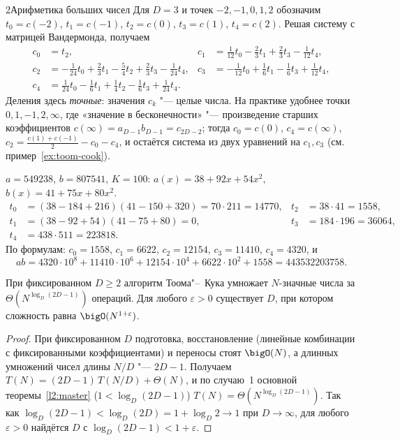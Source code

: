 \begin{lecture}{2}{Арифметика больших чисел}
Для $D = 3$ и точек $-2, -1, 0, 1, 2$ обозначим $t_0 = c(-2)$, $t_1 = c(-1)$, $t_2 = c(0)$,
$t_3 = c(1)$, $t_4 = c(2)$. Решая систему с матрицей Вандермонда, получаем
\[
\begin{aligned}
  c_0 &= t_2, &
  c_1 &= \tfrac{1}{12}t_0 - \tfrac23 t_1 + \tfrac23 t_3 - \tfrac1{12} t_4,\\
  c_2 &= -\tfrac1{24} t_0 + \tfrac23 t_1 - \tfrac54 t_2 + \tfrac23 t_3 - \tfrac1{24} t_4, &
  c_3 &= -\tfrac1{12} t_0 + \tfrac16 t_1 - \tfrac16 t_3 + \tfrac1{12} t_4,\\
  c_4 &= \tfrac1{24} t_0 - \tfrac16 t_1 + \tfrac14 t_2 - \tfrac16 t_3 + \tfrac1{24} t_4.
\end{aligned}
\]
Деления здесь \emph{точные}: значения $c_k$ "--- целые числа. На практике удобнее точки
$0, 1, -1, 2, \infty$, где «значение в бесконечности» "--- произведение старших коэффициентов
$c(\infty) = a_{D-1} b_{D-1} = c_{2D-2}$; тогда $c_0 = c(0)$, $c_4 = c(\infty)$,
$c_2 = \frac{c(1) + c(-1)}{2} - c_0 - c_4$, и остаётся система из двух уравнений на $c_1, c_3$
(см. пример~\ref{ex:toom-cook}).

\begin{example}
$a = 549238$, $b = 807541$, $K = 100$: $a(x) = 38 + 92x + 54x^2$, $b(x) = 41 + 75x + 80x^2$.
\[
\begin{aligned}
  t_0 &= (38 - 184 + 216)(41 - 150 + 320) = 70 \cdot 211 = 14770, &
  t_2 &= 38 \cdot 41 = 1558,\\
  t_1 &= (38 - 92 + 54)(41 - 75 + 80) = 0, & t_3 &= 184 \cdot 196 = 36064,\\
  t_4 &= 438 \cdot 511 = 223818.
\end{aligned}
\]
По формулам: $c_0 = 1558$, $c_1 = 6622$, $c_2 = 12154$, $c_3 = 11410$, $c_4 = 4320$, и
\[
  ab = 4320 \cdot 10^8 + 11410 \cdot 10^6 + 12154 \cdot 10^4 + 6622 \cdot 10^2 + 1558
     = 443532203758.
\]
\end{example}


\begin{theorem}\label{l2:toom}
При фиксированном $D \ge 2$ алгоритм Тоома"--~Кука умножает $N$-значные числа за
$\Theta(N^{\log_D (2D - 1)})$ операций. Для любого $\varepsilon > 0$ существует $D$, при котором
сложность равна $\bigO(N^{1 + \varepsilon})$.
\end{theorem}

\begin{proof}
При фиксированном $D$ подготовка, восстановление (линейные комбинации с фиксированными
коэффициентами) и переносы стоят $\bigO(N)$, а длинных умножений чисел длины $N/D$ "---
$2D - 1$. Получаем $T(N) = (2D - 1)\,T(N/D) + \Theta(N)$, и по случаю~1 основной
теоремы~\ref{l2:master} ($1 < \log_D(2D - 1)$) $T(N) = \Theta(N^{\log_D(2D-1)})$. Так как
$\log_D (2D - 1) < \log_D (2D) = 1 + \log_D 2 \to 1$ при $D \to \infty$, для любого
$\varepsilon > 0$ найдётся $D$ с $\log_D (2D - 1) < 1 + \varepsilon$.
\end{proof}


\end{lecture}
